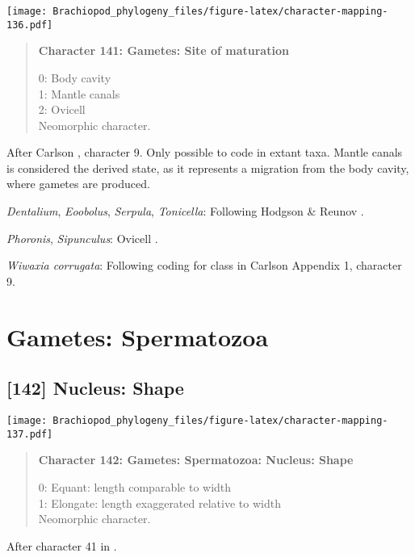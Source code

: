 \documentclass[openany]{book}
\theoremstyle{definition}
\theoremstyle{definition}
\theoremstyle{definition}
\theoremstyle{remark}
\begin{document}
\texttt{[image: Brachiopod\_phylogeny\_files/figure-latex/character-mapping-136.pdf]}

\begin{quote}
\textbf{Character 141: Gametes: Site of maturation}

0: Body cavity\\
1: Mantle canals\\
2: Ovicell\\
Neomorphic character.
\end{quote}

After Carlson \citeyearpar{Carlson1995Phylogeneticrelationships},
character 9. Only possible to code in extant taxa. Mantle canals is
considered the derived state, as it represents a migration from the body
cavity, where gametes are produced.

\hypertarget{Dentalium-coding-141}{}
\emph{Dentalium}, \emph{Eoobolus}, \emph{Serpula}, \emph{Tonicella}:
Following Hodgson \& Reunov \citeyearpar{Hodgson1994Ultrastructureof}.

\hypertarget{Phoronis-coding-141}{}
\emph{Phoronis}, \emph{Sipunculus}: Ovicell \citep{Franzen1977}.

\hypertarget{Wiwaxia_corrugata-coding-141}{}
\emph{Wiwaxia corrugata}: Following coding for class in Carlson
\citeyearpar{Carlson1995Phylogeneticrelationships} Appendix 1, character
9.

\section{Gametes: Spermatozoa}\label{gametes-spermatozoa}

\subsection*{{[}142{]} Nucleus: Shape}\label{nucleus-shape}

\texttt{[image: Brachiopod\_phylogeny\_files/figure-latex/character-mapping-137.pdf]}

\begin{quote}
\textbf{Character 142: Gametes: Spermatozoa: Nucleus: Shape}

0: Equant: length comparable to width\\
1: Elongate: length exaggerated relative to width\\
Neomorphic character.
\end{quote}

After character 41 in \citet{Ponder1997}.
\end{document}
